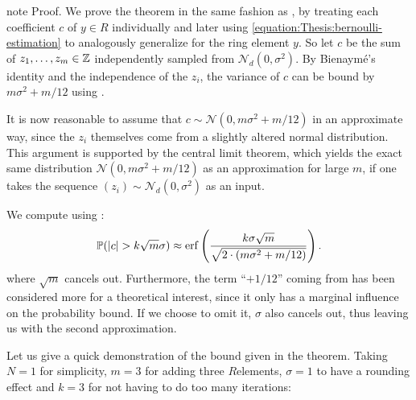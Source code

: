 \documentclass[letterpaper,10pt,english]{jupyterBook}
\begin{document}
\begin{sphinxadmonition}{note}
\sphinxAtStartPar
Proof. We prove the theorem in the same fashion as {\hyperref[\detokenize{Thesis:sampling-bound}]{}}, by treating each coefficient \(c\) of \(y \in R\) individually and later using \eqref{equation:Thesis:bernoulli-estimation} to analogously generalize for the ring element \(y\).
So let \(c\) be the sum of \(z_1,\dots,z_m \in \mathbb Z\) independently sampled from \(\mathcal N_d(0,\sigma^2)\).
By Bienaymé’s identity and the independence of the \(z_i\), the variance of \(c\) can be bound by \(m\sigma^2 +m/12\) using {\hyperref[\detokenize{Thesis:discrete-variance}]{}}.

\sphinxAtStartPar
It is now reasonable to assume that \(c \sim \mathcal N(0,m\sigma^2 +m/12)\) in an approximate way, since the \(z_i\) themselves come from a slightly altered normal distribution.
This argument is supported by the central limit theorem, which yields the exact same distribution \(\mathcal N(0,m\sigma^2 +m/12)\) as an approximation for large \(m\), if one takes the sequence \((z_i) \sim \mathcal N_d(0,\sigma^2)\) as an input.

\sphinxAtStartPar
We compute using {\hyperref[\detokenize{Thesis:property-error-function}]{}}:
\begin{equation*}
\begin{split}\mathbb P(\left\lvert c \right\rvert > k\sqrt{m}\sigma) \approx \mathrm{erf}\left( \frac{k\sigma\sqrt{m}}{\sqrt{2\cdot(m\sigma^2+m/12)}} \right).\end{split}
\end{equation*}
\sphinxAtStartPar
where \(\sqrt{m}\) cancels out.
Furthermore, the term “\(+1/12\)” coming from {\hyperref[\detokenize{Thesis:discrete-variance}]{}} has been considered more for a theoretical interest, since it only has a marginal influence on the probability bound.
If we choose to omit it, \(\sigma\) also cancels out, thus leaving us with the second approximation.
\end{sphinxadmonition}

\sphinxAtStartPar
Let us give a quick demonstration of the bound given in the theorem.
Taking \(N=1\) for simplicity, \(m=3\) for adding three \(R\)\sphinxhyphen{}elements, \(\sigma = 1\) to have a rounding effect and \(k=3\) for not having to do too many iterations:
\end{document}

